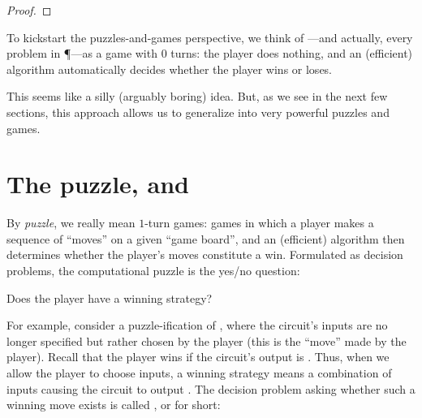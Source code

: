 \begin{proof}
\end{proof}

To kickstart the puzzles-and-games perspective, we think of ---and actually, every problem in \P---as a game with \(0\) turns: the
player does nothing, and an (efficient) algorithm automatically decides whether
the player wins or loses.

This seems like a silly (arguably boring) idea.  But, as we see in the next few
sections, this approach allows us to generalize  into
very powerful puzzles and games.

\section{The  puzzle, and \NP}

By \emph{puzzle}, we really mean \(1\)-turn games: games in which a player
makes a sequence of ``moves'' on a given ``game board'', and an (efficient)
algorithm then determines whether the player's moves constitute a win.
Formulated as decision problems, the computational puzzle is the yes/no
question:
\begin{center}
  Does the player have a winning strategy?
\end{center}

For example, consider a puzzle-ification of , where the
circuit's inputs are no longer specified but rather chosen by the player (this
is the ``move'' made by the player).  Recall that the player wins if the
circuit's output is \True.  Thus, when we allow the player to choose inputs, a
winning strategy means a combination of inputs causing the circuit to output
\True.  The decision problem asking whether such a winning move exists is
called , or  for short:

%
%

